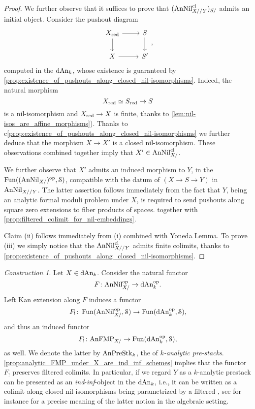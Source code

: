 \documentclass[10pt,a4paper,reqno]{amsart} %
\theoremstyle{plain}
\theoremstyle{definition}
\theoremstyle{remark}
\numberwithin{equation}{section}
\newtheorem{construction}[thm]{Construction}
\begin{document}
\begin{proof}
    We further observe that it suffices to prove that $(\mathrm{AnNil}_{X//Y}^{\mathrm{cl}})_{S/}$ admits an initial object.
    Consider the pushout diagram
        \[
        \begin{tikzcd}
            X_\red \ar{r} \ar{d} & S \ar{d} \\
            X \ar{r} & S'
        \end{tikzcd},
        \]
    computed in the \infcat $\mathrm{dAn}_k$,
    whose existence is guaranteed by \cref{prop:existence_of_pushouts_along_closed_nil-isomorphisms}. Indeed, the natural morphism 
        \[X_{\mathrm{red}} \simeq S_{\mathrm{red}} \to S\]
    is a nil-isomorphism and $X_{\mathrm{red}} \to X$ is finite, thanks to \cref{lem:nil-isos_are_affine_morphisms}). Thanks to c\ref{prop:existence_of_pushouts_along_closed_nil-isomorphisms}
    we further deduce that the morphism $X \to X'$ is a closed nil-isomorphism. These observations combined together imply that
    $X' \in \mathrm{AnNil}_{X/}^{\mathrm{cl}}$.
    
    We further observe that $X'$ admits an induced morphism to $Y$, in the \infcat $\operatorname{Fun}((\mathrm{AnNil}_{X/})^\mathrm{op}, \mathcal S)$, compatible with the datum
    of $(X \to S \to Y)$ in $\mathrm{AnNil}_{X//Y}$. The latter assertion follows immediately from the fact that $Y$, being an analytic formal moduli problem under $X$,
    is required to send pushouts along square zero extensions
    to fiber products of spaces. together with \cref{prop:filtered_colimit_for_nil-embeddings}.

    Claim (ii) follows immediately from (i) combined with Yoneda Lemma. To prove (iii) we simply notice that the \infcat $\mathrm{AnNil}^{\mathrm{cl}}_{X//Y}$ admits
    finite colimits, thanks to \cref{prop:existence_of_pushouts_along_closed_nil-isomorphisms}.
\end{proof}

\begin{construction}\label{const:anFMP_as_ind_inf_schemes} Let $X \in \mathrm{dAn}_k$. Consider the natural functor
    \[
        F \colon \mathrm{AnNil}_{X/} ^\mathrm{op} \to \mathrm{dAn}_k ^\mathrm{op}.
    \]
Left Kan extension along $F$ induces a functor
    \[
        F_! \colon \operatorname{Fun}( \mathrm{AnNil}_{X/ }^\mathrm{op}, \mathcal S) \to \operatorname{Fun}  (\mathrm{dAn}_k^\mathrm{op}, \mathcal S),
    \]
and thus an induced functor
    \[
        F_! \colon \mathrm{AnFMP}_{X/} \to \operatorname{Fun}(\mathrm{dAn}_k^\mathrm{op}, \mathcal S),
    \]
as well. We denote the latter \infcat by $\mathrm{AnPreStk}_k$, the \infcat
of \emph{$k$-analytic pre-stacks}. \cref{prop:analytic_FMP_under_X_are_ind_inf_schemes} implies that the functor $F_!$ preserves filtered colimits.
In particular, if we regard $Y$ as a $k$-analytic prestack can be presented
as an \emph{ind}-\emph{inf}-object in the \infcat $\mathrm{dAn}_k$, i.e., it can be written as a colimit along closed nil-isomorphisms
being parametrized by a filtered \infcat, see for instance \cite{Gaitsgory_Study_II} for a precise meaning
of the latter notion in the algebraic setting.
\end{construction}
\end{document}

